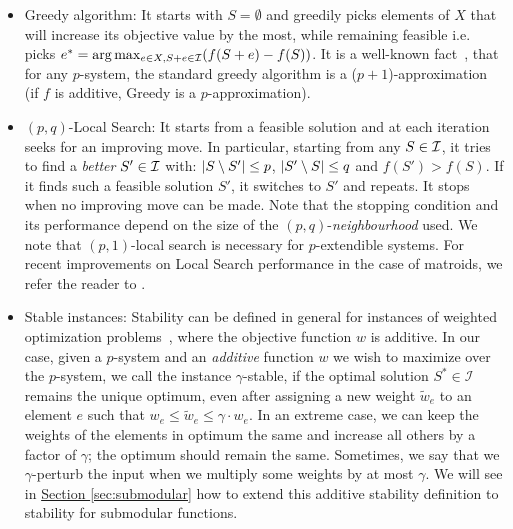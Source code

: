 \begin{itemize}
\item
Greedy algorithm: It starts with $S=\emptyset$ and greedily picks elements of $X$ that will increase its objective value by the most, while remaining feasible i.e. picks $e^*=\arg\max_{e\in X, S+e\in \mathcal{I}}(f(S+e)-f(S))$. It is a well-known fact~\cite{korte1978analysis,nemhauser1978analysis}, that for any $p$-system, the standard greedy algorithm is a ($p+1$)-approximation (if $f$ is additive, Greedy is a $p$-approximation).

\item
$(p,q)$-Local Search: It starts from a feasible solution and at each iteration seeks for an improving move. In particular, starting from any $S\in \mathcal{I}$, it tries to find a \textit{better} $S'\in\mathcal{I}$ with: $|S\setminus S'|\le p$, $|S'\setminus S|\le q$ and $f(S')>f(S)$. If it finds such a feasible solution $S'$, it switches to $S'$ and repeats. It stops when no improving move can be made. Note that the stopping condition and its performance depend on the size of the $(p,q)$-\textit{neighbourhood} used. We note that $(p,1)$-local search is necessary for $p$-extendible systems. For recent improvements on Local Search performance in the case of matroids, we refer the reader to \cite{lee2009submodular}.

\item
Stable instances: Stability can be defined in general for instances of weighted optimization problems~\cite{bilu2012stable}, where the objective function $w$ is additive. In our case, given a $p$-system and an \textit{additive} function $w$ we wish to maximize over the $p$-system, we call the instance $\gamma$-stable, if the optimal solution $S^* \in \mathcal{I}$ remains the unique optimum, even after assigning a new weight $\tilde{w}_e$ to an element $e$ such that $w_e\le \tilde{w}_e\le \gamma \cdot w_e$. In an extreme case, we can keep the weights of the elements in optimum the same and increase all others by a factor of $\gamma$; the optimum should remain the same. Sometimes, we say that we $\gamma$-perturb the input when we multiply some weights by at most $\gamma$. We will see in \hyperref[sec:submodular] {Section \ref{sec:submodular}} how to extend this additive stability definition to stability for submodular functions.

\end{itemize}